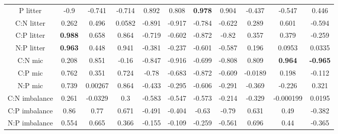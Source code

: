 \documentclass[authoryear,preprint,review,12pt]{elsarticle}
\begin{document}
\begin{table}[h!]
\begin{center}
{\begin{tabular}{ccccccccccc}
  P litter & -0.9 & -0.741 & -0.714 & 0.892 & 0.808 & \textbf{ 0.978 } & 0.904 & -0.437 & -0.547 & 0.446 \\ 
  C:N litter & 0.262 & 0.496 & 0.0582 & -0.891 & -0.917 & -0.784 & -0.622 & 0.289 & 0.601 & -0.594 \\ 
  C:P litter & \textbf{ 0.988 } & 0.658 & 0.864 & -0.719 & -0.602 & -0.872 & -0.82 & 0.357 & 0.379 & -0.259 \\ 
  N:P litter & \textbf{ 0.963 } & 0.448 & 0.941 & -0.381 & -0.237 & -0.601 & -0.587 & 0.196 & 0.0953 & 0.0335 \\ 
  C:N mic & 0.208 & 0.851 & -0.16 & -0.847 & -0.916 & -0.699 & -0.808 & 0.809 & \textbf{ 0.964 } & \textbf{ -0.965 } \\ 
  C:P mic & 0.762 & 0.351 & 0.724 & -0.78 & -0.683 & -0.872 & -0.609 & -0.0189 & 0.198 & -0.112 \\ 
  N:P mic & 0.739 & 0.00267 & 0.864 & -0.433 & -0.295 & -0.606 & -0.291 & -0.369 & -0.226 & 0.321 \\ 
  C:N imbalance & 0.261 & -0.0329 &  0.3 & -0.583 & -0.547 & -0.573 & -0.214 & -0.329 & -0.000199 & 0.0195 \\ 
  C:P imbalance & 0.86 & 0.77 & 0.671 & -0.491 & -0.404 & -0.63 & -0.79 & 0.631 & 0.49 & -0.382 \\ 
  N:P imbalance & 0.554 & 0.665 & 0.366 & -0.155 & -0.109 & -0.259 & -0.561 & 0.696 & 0.44 & -0.365 \\ 
   \hline
\end{tabular}
}
\end{center}
\end{table}
\newpage
\end{document}

